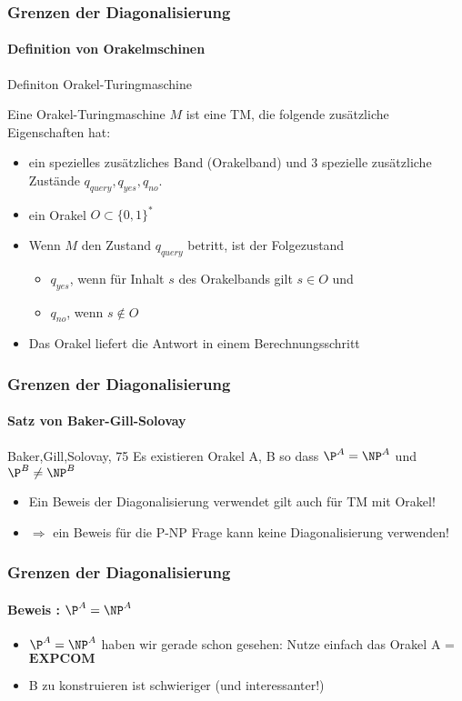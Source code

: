 \begin{frame}
	\frametitle{Grenzen der Diagonalisierung}
	\framesubtitle{Definition von Orakelmschinen}
	\begin{KITinfoblock}{Definiton Orakel-Turingmaschine} {
			Eine Orakel-Turingmaschine $M$ ist eine TM, die folgende zusätzliche Eigenschaften hat:
			\begin{itemize}
				\item<2-> ein spezielles zusätzliches Band (Orakelband) und 3 spezielle zusätzliche Zustände $q_{query}, q_{yes}, q_{no}$.
				\item <3-> ein Orakel $O \subset \{0,1\}^*$
				\item <4-> Wenn $M$ den Zustand $q_{query}$ betritt, ist der Folgezustand
					\begin{itemize}
					\item $q_{yes}$, wenn für Inhalt $s$ des Orakelbands gilt $s \in O$ und
				    \item	$q_{no}$, wenn  $s \notin O$ 
					\end{itemize} 
				\item<5-> Das Orakel liefert die Antwort in einem Berechnungsschritt
			\end{itemize}
		}
	\end{KITinfoblock}
\end{frame}
\begin{frame}
	\frametitle{Grenzen der Diagonalisierung}
	\framesubtitle{Satz von Baker-Gill-Solovay}
	\begin{KITinfoblock}{Baker,Gill,Solovay, 75}
		Es existieren Orakel A, B so dass ${\P}^A = {\NP}^A$ und ${\P}^B \neq {\NP}^B$
	\end{KITinfoblock}
	\pause
	\begin{overprint}
		\begin{itemize}[<+->]
		\item Ein Beweis der Diagonalisierung verwendet gilt auch für TM mit Orakel!
		\item $\Rightarrow$ ein Beweis für die P-NP Frage kann keine Diagonalisierung
		verwenden!
		\end{itemize}
	\end{overprint}
\end{frame}

\begin{frame}
	\frametitle{Grenzen der Diagonalisierung}
	\framesubtitle{Beweis : ${\P}^A = {\NP}^A$ }
	\begin{itemize}[<+->]
	
	\item ${\P}^A = {\NP}^A$ haben wir gerade schon gesehen:
			Nutze einfach das Orakel A = $\mathbf{EXPCOM}$
	\item B zu konstruieren ist schwieriger (und interessanter!)
	\end{itemize}	
\end{frame}

